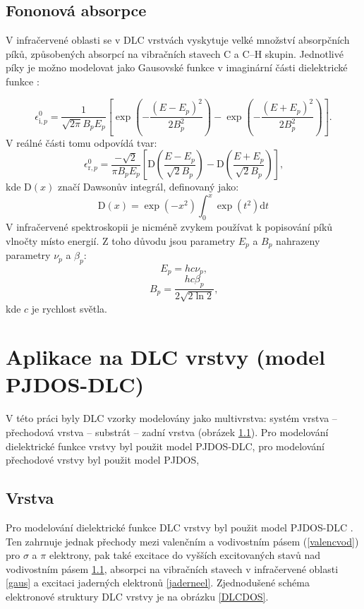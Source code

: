 \subsection{Fononová absorpce}
V infračervené oblasti se v DLC vrstvách vyskytuje velké množství absorpčních píků, způsobených absorpcí na vibračních stavech C a C--H skupin. Jednotlivé píky je možno modelovat jako Gausovské funkce v imaginární části dielektrické funkce \cite{franta2007}:

\begin{equation}
\epsilon^0_{\mathrm{i},p} = \frac{1}{\sqrt{2 \pi} B_p E_p} \left[ \exp\left(-\frac{(E-E_p)^2}{2B_p^2}\right) - \exp\left(-\frac{(E+E_p)^2}{2B_p^2}\right) \right] \text{.}
\end{equation}
V reálné části tomu odpovídá tvar:
\begin{equation}
\epsilon^0_{\mathrm{r},p} = \frac{-\sqrt{2}}{\pi B_p E_p} \left[ \mathrm{D}\left(\frac{E-E_p}{\sqrt{2}B_p}\right) - \mathrm{D}\left(\frac{E+E_p}{\sqrt{2}B_p}\right) \right] \text{,}
\end{equation}
kde $\mathrm{D}(x)$ značí Dawsonův integrál, definovaný jako:
\begin{equation}
\mathrm{D}(x) = \exp(-x^2)\int_0^x \exp(t^2) \mathrm{d}t
\end{equation}
V infračervené spektroskopii je nicméně zvykem používat k popisování píků vlnočty místo energií. Z toho důvodu jsou parametry $E_p$ a $B_p$ nahrazeny parametry $\nu_p$ a $\beta_p$:
\begin{equation}
E_p = h c \nu_p \text{,}
\end{equation}
\begin{equation}
B_p = \frac{h c \beta_p}{2 \sqrt{2 \ln 2}} \text{,}
\end{equation}
kde $c$ je rychlost světla. 




\section{Aplikace na DLC vrstvy (model PJDOS-DLC)}
V této práci byly DLC vzorky modelovány jako multivrstva: systém vrstva -- přechodová vrstva -- substrát -- zadní vrstva (obrázek \ref{}). Pro modelování dielektrické funkce vrstvy byl použit model PJDOS-DLC, pro modelování přechodové vrstvy byl použit model PJDOS, 

\subsection{Vrstva}
Pro modelování dielektrické funkce DLC vrstvy byl použit model PJDOS-DLC \cite{franta2007}. Ten zahrnuje jednak přechody mezi valenčním a vodivostním pásem (\ref{valencvod}) pro $\sigma$ a $\pi$ elektrony, pak také excitace do vyšších excitovaných stavů nad vodivostním pásem \ref{}, absorpci na vibračních stavech v infračervené oblasti \ref{gaus} a excitaci jaderných elektronů \ref{jaderneel}. Zjednodušené schéma elektronové struktury DLC vrstvy je na obrázku \ref{DLCDOS}.

